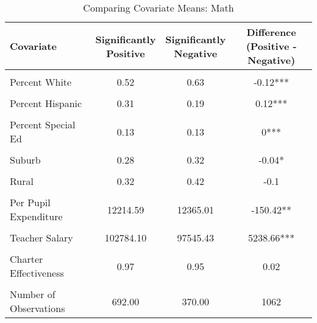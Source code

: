 \begin{table}[!h]
\centering
\caption{\label{tab:cov_means_math}Comparing Covariate Means: Math}
\centering
\begin{tabular}[t]{lccc}
\toprule
Covariate & \makecell[c]{Significantly\\Positive} & \makecell[c]{Significantly\\Negative} & \makecell[c]{Difference\\(Positive - Negative)}\\
\midrule
\cellcolor{gray!10}{Log of Enrollment} & \cellcolor{gray!10}{8.01} & \cellcolor{gray!10}{8.03} & \cellcolor{gray!10}{-0.02***}\\
Percent White & 0.52 & 0.63 & -0.12***\\
\cellcolor{gray!10}{Percent Black} & \cellcolor{gray!10}{0.06} & \cellcolor{gray!10}{0.13} & \cellcolor{gray!10}{-0.07***}\\
Percent Hispanic & 0.31 & 0.19 & 0.12***\\
\cellcolor{gray!10}{Percent Free/Reduced Lunch} & \cellcolor{gray!10}{0.55} & \cellcolor{gray!10}{0.54} & \cellcolor{gray!10}{0.01***}\\
Percent Special Ed & 0.13 & 0.13 & 0***\\
\cellcolor{gray!10}{Urban} & \cellcolor{gray!10}{0.16} & \cellcolor{gray!10}{0.09} & \cellcolor{gray!10}{0.08***}\\
Suburb & 0.28 & 0.32 & -0.04*\\
\cellcolor{gray!10}{Town} & \cellcolor{gray!10}{0.24} & \cellcolor{gray!10}{0.18} & \cellcolor{gray!10}{0.06}\\
Rural & 0.32 & 0.42 & -0.1\\
\cellcolor{gray!10}{Per Pupil Revenue} & \cellcolor{gray!10}{12457.53} & \cellcolor{gray!10}{12154.63} & \cellcolor{gray!10}{302.9*}\\
Per Pupil Expenditure & 12214.59 & 12365.01 & -150.42**\\
\cellcolor{gray!10}{Student-Teacher Ratio} & \cellcolor{gray!10}{18.24} & \cellcolor{gray!10}{17.11} & \cellcolor{gray!10}{1.13***}\\
Teacher Salary & 102784.10 & 97545.43 & 5238.66***\\
\cellcolor{gray!10}{Number of Magnet Schools} & \cellcolor{gray!10}{0.04} & \cellcolor{gray!10}{0.77} & \cellcolor{gray!10}{-0.73}\\
Charter Effectiveness & 0.97 & 0.95 & 0.02\\
\cellcolor{gray!10}{Baseline Performance} & \cellcolor{gray!10}{-0.24} & \cellcolor{gray!10}{-0.20} & \cellcolor{gray!10}{-0.04***}\\
\midrule
Number of Observations & 692.00 & 370.00 & 1062\\
\bottomrule
\end{tabular}
\end{table}
